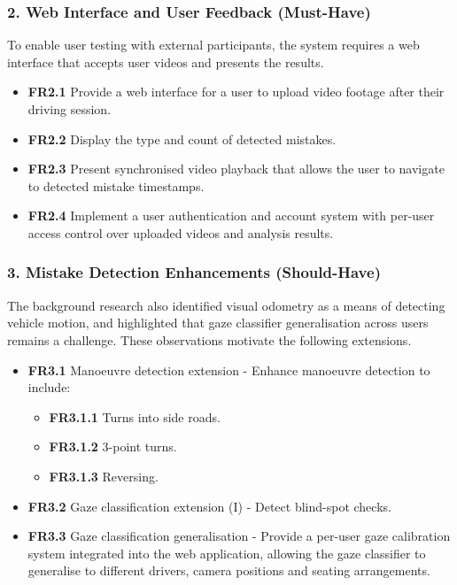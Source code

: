 \documentclass{article}
\begin{document}
\subsubsection*{2. Web Interface and User Feedback (Must-Have)}
To enable user testing with external participants, the system requires a web interface that accepts user videos and presents the results.

\begin{itemize}
    \item \textbf{FR2.1} Provide a web interface for a user to upload video footage after their driving session.
    \item \textbf{FR2.2} Display the type and count of detected mistakes.
    \item \textbf{FR2.3} Present synchronised video playback that allows the user to navigate to detected mistake timestamps.
    \item \textbf{FR2.4} Implement a user authentication and account system with per-user access control over uploaded videos and analysis results.
\end{itemize}

\subsubsection*{3. Mistake Detection Enhancements (Should-Have)}
The background research also identified visual odometry as a means of detecting vehicle motion, and highlighted that gaze classifier generalisation across users remains a challenge. These observations motivate the following extensions.
\begin{itemize}
    \item \textbf{FR3.1} Manoeuvre detection extension - Enhance manoeuvre detection to include:
    \begin{itemize}
        \item \textbf{FR3.1.1} Turns into side roads.
        \item \textbf{FR3.1.2} 3-point turns.
        \item \textbf{FR3.1.3} Reversing.
    \end{itemize}
    \item \textbf{FR3.2} Gaze classification extension (I) - Detect blind-spot checks.
    \item \textbf{FR3.3} Gaze classification generalisation - Provide a per-user gaze calibration system integrated into the web application, allowing the gaze classifier to generalise to different drivers, camera positions and seating arrangements.
\end{itemize}
\end{document}
